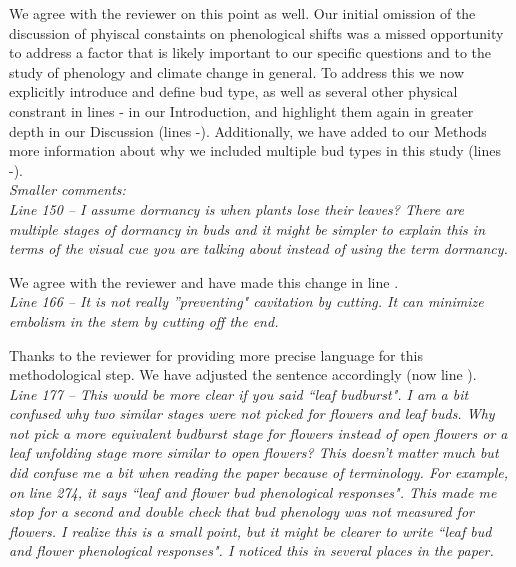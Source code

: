 \documentclass[11pt]{article}
\begin{document}
We agree with the reviewer on this point as well. Our initial omission of the discussion of phyiscal constaints on phenological shifts was a missed opportunity to address a factor that is likely important to our specific questions and to the study of phenology and climate change in general. To address this we now explicitly introduce and define bud type, as well as several other physical constrant in lines - in our Introduction, and highlight them again in greater depth in our Discussion (lines \lineref{}-\lineref{}). Additionally, we have added to our Methods more information about why we included multiple bud types in this study (lines \lineref{}-\lineref{}). \\


\emph{Smaller comments:}\\

\emph{Line 150 – I assume dormancy is when plants lose their leaves? There are multiple stages of dormancy in buds and it might be simpler to explain this in terms of the visual cue you are talking about instead of using the term dormancy.}

We agree with the reviewer and have made this change in line .\\

\emph{Line 166 – It is not really ''preventing" cavitation by cutting. It can minimize embolism in the stem by cutting off the end.}

Thanks to the reviewer for providing more precise language for this methodological step. We have adjusted the sentence accordingly (now line ).\\


\emph{Line  177 – This would be more clear if you said ``leaf budburst". I am a bit confused why two similar stages were not picked for flowers and leaf buds. Why not pick a more equivalent budburst stage for flowers instead of open flowers or a leaf unfolding stage more similar to open flowers? This doesn’t matter much but did confuse me a bit when reading the paper because of terminology. For example, on line 274, it says ``leaf and flower bud phenological responses". This made me stop for a second and double check that bud phenology was not measured for flowers. I realize this is a small point, but it might be clearer to write ``leaf bud and flower phenological responses". I noticed this in several places in the paper.}\\
\end{document}
